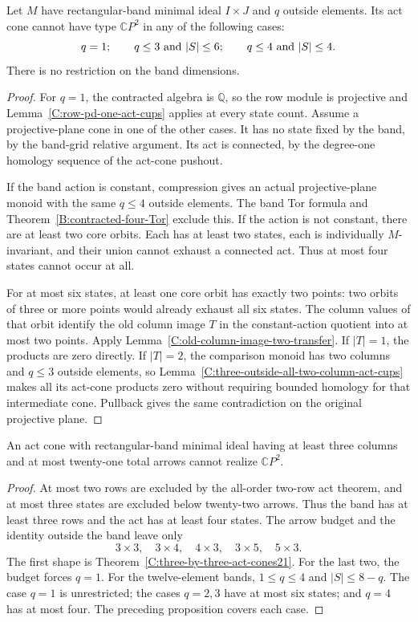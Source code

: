 \begin{proposition}
\label{C:three-outside-six-state-band-cones}
Let $M$ have rectangular-band minimal ideal $I\times J$ and
$q$ outside elements.  Its act cone cannot have type
$\mathbb CP^2$ in any of the following cases:
\[
 q=1;\qquad q\leq3\ \hbox{and }|S|\leq6;
 \qquad q\leq4\ \hbox{and }|S|\leq4.
\]
There is no restriction on the band dimensions.
\end{proposition}
\begin{proof}
For $q=1$, the contracted algebra is $\mathbb Q$, so the
row module is projective and
Lemma~\ref{C:row-pd-one-act-cups} applies at every state count.
Assume a projective-plane cone in one of the other cases.
It has no state fixed by the band, by the band-grid relative
argument.  Its act is connected, by the degree-one homology
sequence of the act-cone pushout.

If the band action is constant, compression gives an actual
projective-plane monoid with the same $q\leq4$ outside
elements.  The band Tor formula and
Theorem~\ref{B:contracted-four-Tor} exclude this.
If the action is not constant, there are at least two core
orbits.  Each has at least two states, each is individually
$M$-invariant, and their union cannot exhaust a connected
act.  Thus at most four states cannot occur at all.

For at most six states, at least one core orbit has exactly
two points: two orbits of three or more points would already
exhaust all six states.  The column values of that orbit
identify the old column image $T$ in the constant-action
quotient into at most two points.  Apply
Lemma~\ref{C:old-column-image-two-transfer}.
If $|T|=1$, the products are zero directly.  If $|T|=2$, the
comparison monoid has two columns and $q\leq3$ outside
elements, so
Lemma~\ref{C:three-outside-all-two-column-act-cups} makes
all its act-cone products zero without requiring bounded
homology for that intermediate cone.  Pullback gives the
same contradiction on the original projective plane.
\end{proof}

\begin{corollary}
\label{C:three-or-more-column-act-cones21}
An act cone with rectangular-band minimal ideal having at
least three columns and at most twenty-one total arrows
cannot realize $\mathbb CP^2$.
\end{corollary}
\begin{proof}
At most two rows are excluded by the all-order two-row act
theorem, and at most three states are excluded below
twenty-two arrows.  Thus the band has at least three rows
and the act has at least four states.  The arrow budget and
the identity outside the band leave only
\[
 3\times3,\quad3\times4,\quad4\times3,
 \quad3\times5,\quad5\times3.
\]
The first shape is Theorem~\ref{C:three-by-three-act-cones21}.
For the last two, the budget forces $q=1$.
For the twelve-element bands, $1\leq q\leq4$ and
$|S|\leq8-q$.  The case $q=1$ is unrestricted; the cases
$q=2,3$ have at most six states; and $q=4$ has at most four.
The preceding proposition covers each case.
\end{proof}
